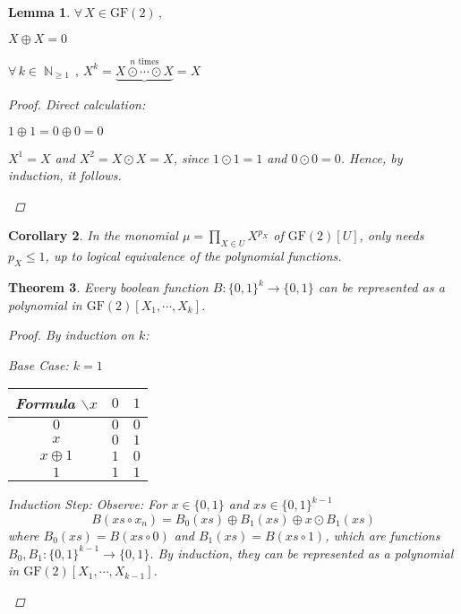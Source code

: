 \documentclass[12pt]{article}
\newcommand{\Forall}[1]{\forall\,{#1}\,,\,}
\DeclareMathOperator{\N}{\mathbb{N}}
\newcommand*{\B}{\{0,1\}}
\newtheorem{theorem}{Theorem}[subsection]
\newtheorem{lemma}[theorem]{Lemma}
\newtheorem{corollary}[theorem]{Corollary}
\begin{document}
\begin{lemma}
  $\Forall{X\in\text{GF}(2)}$
  \begin{compactenum}[(i)]
    \item $X\oplus X=0$
    \item $\Forall{k\in\N_{\geq 1}}X^k=\underbrace{X\odot \cdots\odot X}^{n\text{ times}}=X$
  \end{compactenum}
  \begin{proof}
    Direct calculation:
    \begin{compactenum}[(i)]
      \item $1\oplus 1=0\oplus 0=0$
      \item $X^1=X$ and $X^2=X\odot X=X$, since $1\odot 1=1$ and $0\odot 0=0$. Hence, by induction, it follows.
    \end{compactenum}
  \end{proof}
\end{lemma}

\begin{corollary}
  In the monomial $\mu=\prod_{X\in U} X^{p_X}$ of $\text{GF}(2)[U]$, only needs $p_X\leq 1$, up to logical equivalence of the polynomial functions.
\end{corollary}

\begin{theorem}
  \label{polynom}
  Every boolean function $B:\B^k\to\B$ can be represented as a polynomial in $\text{GF}(2)[X_1,\cdots,X_k]$.
  \begin{proof}
    By induction on $k$:
    \begin{compactitem}
      \item Base Case: $k=1$ \begin{table}[H]
        \centering
        \begin{tabular}{c||c|c}
          Formula $\backslash x$ & $0$ & $1$\\\hline\hline
          $0$ & $0$ & $0$\\
          $x$ & $0$ & $1$\\
          $x\oplus 1$ & $1$ & $0$\\
          $1$ & $1$ & $1$
        \end{tabular}
      \end{table}
      \item Induction Step: Observe: For $x\in\B$ and $xs\in\B^{k-1}$ $$B(xs\circ x_n)=B_0(xs)\oplus B_1(xs)\oplus x\odot B_1(xs)$$ where $B_0(xs)=B(xs\circ 0)$ and $B_1(xs)=B(xs\circ 1)$, which are functions $B_0,B_1:\B^{k-1}\to\B$. By induction, they can be represented as a polynomial in $\text{GF}(2)[X_1,\cdots,X_{k-1}]$.
    \end{compactitem}
  \end{proof}
\end{theorem}
\end{document}
